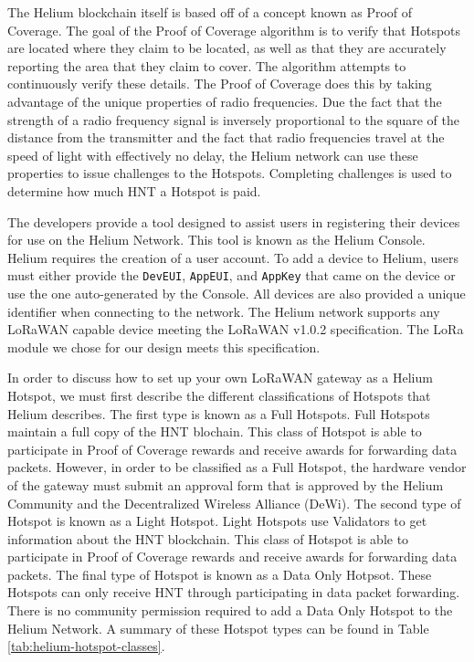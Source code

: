 The Helium blockchain itself is based off of a concept known as Proof of Coverage. The goal of the Proof of Coverage algorithm is to verify that Hotspots are located where they claim to be located, as well as that they are accurately reporting the area that they claim to cover. The algorithm attempts to continuously verify these details. The Proof of Coverage does this by taking advantage of the unique properties of radio frequencies. Due the fact that the strength of a radio frequency signal is inversely proportional to the square of the distance from the transmitter and the fact that radio frequencies travel at the speed of light with effectively no delay, the Helium network can use these properties to issue challenges to the Hotspots. Completing challenges is used to determine how much HNT a Hotspot is paid.

The developers provide a tool designed to assist users in registering their devices for use on the Helium Network. This tool is known as the Helium Console. Helium requires the creation of a user account. To add a device to Helium, users must either provide the \texttt{DevEUI}, \texttt{AppEUI}, and \texttt{AppKey} that came on the device or use the one auto-generated by the Console. All devices are also provided a unique identifier when connecting to the network. The Helium network supports any LoRaWAN capable device meeting the LoRaWAN v1.0.2 specification. The LoRa module we chose for our design meets this specification.

In order to discuss how to set up your own LoRaWAN gateway as a Helium Hotspot, we must first describe the different classifications of Hotspots that Helium describes. The first type is known as a Full Hotspots. Full Hotspots maintain a full copy of the HNT blochain. This class of Hotspot is able to participate in Proof of Coverage rewards and receive awards for forwarding data packets. However, in order to be classified as a Full Hotspot, the hardware vendor of the gateway must submit an approval form that is approved by the Helium Community and the Decentralized Wireless Alliance (DeWi). The second type of Hotspot is known as a Light Hotspot. Light Hotspots use Validators to get information about the HNT blockchain. This class of Hotspot is able to participate in Proof of Coverage rewards and receive awards for forwarding data packets. The final type of Hotspot is known as a Data Only Hotpsot. These Hotspots can only receive HNT through participating in data packet forwarding. There is no community permission required to add a Data Only Hotspot to the Helium Network. A summary of these Hotspot types can be found in Table \ref{tab:helium-hotspot-classes}.

